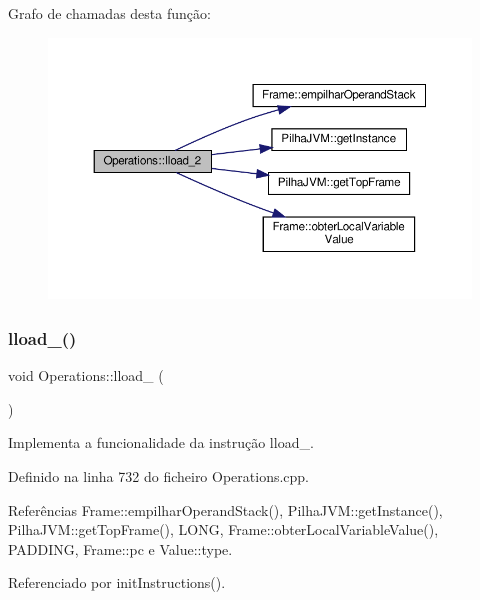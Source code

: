 Grafo de chamadas desta função\+:
\nopagebreak
\begin{figure}[H]
\begin{center}
\leavevmode
\includegraphics[width=350pt]{classOperations_aa59772a5ed2bd59de3d54c635f294e93_cgraph}
\end{center}
\end{figure}
\mbox{\label{classOperations_af2f8b1e41b734f43e73d9d6811eb427b}} 
\subsubsection{\texorpdfstring{lload\+\_()}{lload\_3()}}
{\footnotesize\ttfamily void Operations\+::lload\+\_ (\begin{DoxyParamCaption}{ }\end{DoxyParamCaption})\hspace{0.3cm}{\ttfamily [private]}}



Implementa a funcionalidade da instrução lload\+\_. 



Definido na linha 732 do ficheiro Operations.\+cpp.



Referências Frame\+::empilhar\+Operand\+Stack(), Pilha\+J\+V\+M\+::get\+Instance(), Pilha\+J\+V\+M\+::get\+Top\+Frame(), L\+O\+NG, Frame\+::obter\+Local\+Variable\+Value(), P\+A\+D\+D\+I\+NG, Frame\+::pc e Value\+::type.



Referenciado por init\+Instructions().

